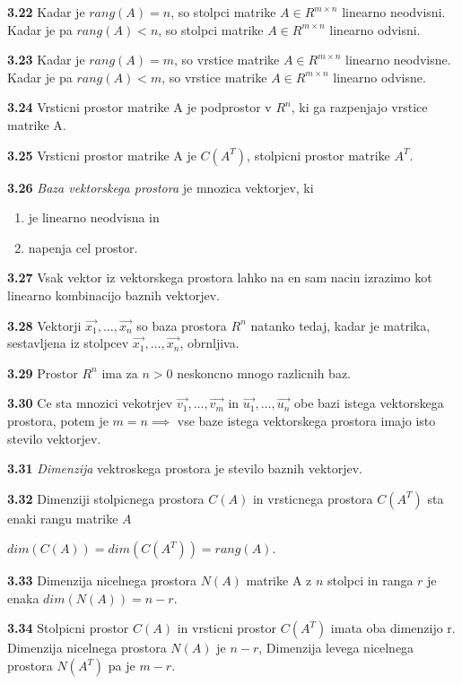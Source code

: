 \documentclass{article}
\begin{document}
\begin{multicols}{3}
\textbf{3.22} Kadar je $rang(A) = n$, so stolpci matrike $A \in R^{m \times n}$ linearno
neodvisni. Kadar je pa $rang(A) < n$, so stolpci matrike $A \in R^{m \times n}$ linearno odvisni.

\textbf{3.23} Kadar je $rang(A) = m$, so vrstice matrike $A \in R^{m \times n}$ linearno neodvisne.
Kadar je pa $rang(A) < m$, so vrstice matrike $A \in R^{m \times n}$ linearno odvisne.

\textbf{3.24} Vrsticni prostor matrike A je podprostor v $R^{n}$, ki ga razpenjajo vrstice matrike A.

\textbf{3.25} Vrsticni prostor matrike A je $C(A^{T})$, stolpicni prostor matrike $A^{T}$.

\textbf{3.26} \textit{Baza vektorskega prostora} je mnozica vektorjev, ki
\begin{enumerate}
    \item je linearno neodvisna in
    \item napenja cel prostor.
\end{enumerate}

\textbf{3.27} Vsak vektor iz vektorskega prostora lahko na en sam nacin izrazimo
kot linearno kombinacijo baznih vektorjev.
 
\textbf{3.28} Vektorji $\vec{x_{1}}, \dots,\vec{x_{n}}$ so baza prostora $R^{n}$ natanko tedaj, kadar 
je matrika, sestavljena iz stolpcev $\vec{x_{1}}, \dots,\vec{x_{n}}$, obrnljiva.

\textbf{3.29} Prostor $R^{n}$ ima za $n > 0$ neskoncno mnogo razlicnih baz.

\textbf{3.30} Ce sta mnozici vekotrjev {$\vec{v_{1}}, \dots,\vec{v_{m}}$} in $\vec{u_{1}}, \dots,\vec{u_{n}}$
obe bazi istega vektorskega prostora, potem je $m = n \implies$ vse baze istega vektorskega prostora imajo
isto stevilo vektorjev.

\textbf{3.31} \textit{Dimenzija} vektroskega prostora je stevilo baznih vektorjev.

\textbf{3.32} Dimenziji stolpicnega prostora $C(A)$ in vrsticnega prostora $C(A^{T})$ sta enaki rangu matrike $A$
\begin{center}
    $dim(C(A)) = dim(C(A^{T})) = rang(A)$.
\end{center}

\textbf{3.33} Dimenzija nicelnega prostora $N(A)$ matrike A z $n$ stolpci in ranga $r$
je enaka $dim(N(A)) = n - r$.

\textbf{3.34} Stolpicni prostor $C(A)$ in vrsticni prostor $C(A^{T})$ imata oba dimenzijo r. Dimenzija
nicelnega prostora $N(A)$ je $n -r$, Dimenzija levega nicelnega prostora $N(A^{T})$ pa je $m - r$.


\end{multicols}
\end{document}
